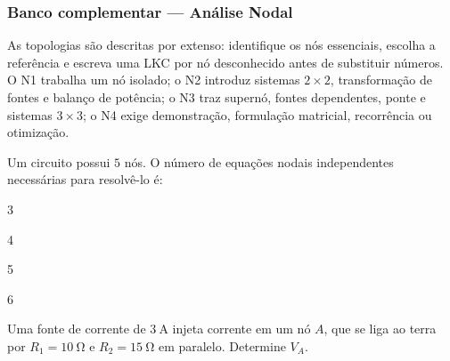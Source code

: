 
\subsubsection*{Banco complementar --- Análise Nodal}

\begin{atencao}
As topologias são descritas por extenso: identifique os nós essenciais,
escolha a referência e escreva uma LKC por nó desconhecido antes de
substituir números. O N1 trabalha um nó isolado; o N2 introduz sistemas
$2\times2$, transformação de fontes e balanço de potência; o N3 traz supernó,
fontes dependentes, ponte e sistemas $3\times3$; o N4 exige demonstração,
formulação matricial, recorrência ou otimização.
\end{atencao}

\blocofixacao

\begin{questao}[1]{}
Um circuito possui $5$ nós. O número de equações nodais independentes
necessárias para resolvê-lo é:
\begin{alternativas}[4]
\item 3
\item 4
\item 5
\item 6
\end{alternativas}
\end{questao}

\begin{questao}[1]{}
Uma fonte de corrente de $\SI{3}{\ampere}$ injeta corrente em um nó $A$, que
se liga ao terra por $R_1=\SI{10}{\ohm}$ e $R_2=\SI{15}{\ohm}$ em paralelo.
Determine $V_A$.
\end{questao}

